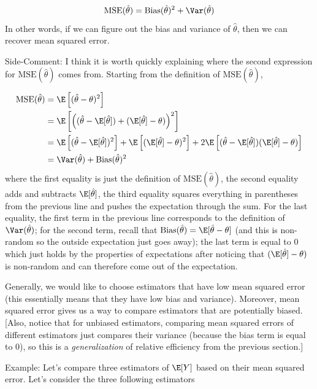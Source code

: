 \documentclass[
  letterpaper,
  DIV=11,
  numbers=noendperiod]{scrreprt}
\begin{document}
\[
  \textrm{MSE}(\hat{\theta}) = \textrm{Bias}(\hat{\theta})^2 + \Var(\hat{\theta})
\] In other words, if we can figure out the bias and variance of
\(\hat{\theta}\), then we can recover mean squared error.

{Side-Comment:} I think it is worth quickly explaining where the second
expression for \(\textrm{MSE}(\hat{\theta})\) comes from. Starting from
the definition of \(\textrm{MSE}(\hat{\theta})\),

\[
  \begin{aligned}
    \textrm{MSE}(\hat{\theta}) &= \E\left[ (\hat{\theta} - \theta)^2\right] \\
    &= \E\left[ \left( (\hat{\theta} - \E[\hat{\theta}]) + (\E[\hat{\theta}] - \theta)\right)^2 \right] \\
    &= \E\left[ (\hat{\theta} - \E[\hat{\theta}])^2 \right] + \E\left[ (\E[\hat{\theta}] - \theta)^2\right] + 2 \E\left[ (\hat{\theta} - \E[\hat{\theta}])(\E[\hat{\theta}] - \theta) \right] \\
    &= \Var(\hat{\theta}) + \textrm{Bias}(\hat{\theta})^2 
  \end{aligned}
\] where the first equality is just the definition of
\(\textrm{MSE}(\hat{\theta})\), the second equality adds and subtracts
\(\E[\hat{\theta}]\), the third equality squares everything in
parentheses from the previous line and pushes the expectation through
the sum. For the last equality, the first term in the previous line
corresponds to the definition of \(\Var(\hat{\theta})\); for the second
term, recall that
\(\textrm{Bias}(\hat{\theta}) = \E[\hat{\theta}-\theta]\) (and this is
non-random so the outside expectation just goes away); the last term is
equal to 0 which just holds by the properties of expectations after
noticing that \((\E[\hat{\theta}] - \theta)\) is non-random and can
therefore come out of the expectation.

Generally, we would like to choose estimators that have low mean squared
error (this essentially means that they have low bias and variance).
Moreover, mean squared error gives us a way to compare estimators that
are potentially biased. {[}Also, notice that for unbiased estimators,
comparing mean squared errors of different estimators just compares
their variance (because the bias term is equal to 0), so this is a
\emph{generalization} of relative efficiency from the previous
section.{]}

{Example: }Let's compare three estimators of \(\E[Y]\) based on their
mean squared error. Let's consider the three following estimators
\end{document}
